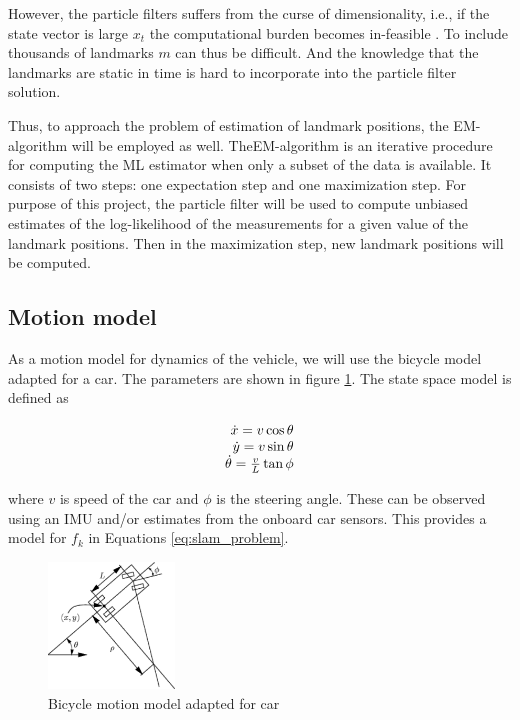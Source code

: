 However, the particle filters suffers from the curse of
dimensionality, i.e., if the state vector is large $x_t$ the
computational burden becomes in-feasible \cite{1453762}. To include
thousands of landmarks $m$ can thus be difficult. And the knowledge
that the landmarks are static in time is hard to incorporate into the
particle filter solution.

Thus, to approach the problem of estimation of landmark positions, the
\gls{EM}-algorithm \cite{Dempster77maximumlikelihood} will be employed
as well. The\gls{EM}-algorithm is an iterative procedure for computing
the \gls{ML} estimator when only a subset of the data is available. It
consists of two steps: one expectation step and one maximization
step. For purpose of this project, the particle filter will be used to compute
unbiased estimates of the log-likelihood of the measurements for a
given value of the landmark positions. Then in the maximization step,
new landmark positions will be computed.



\subsection{Motion model}

As a motion model for dynamics of the vehicle, we will use the bicycle model
adapted for a
car.
The parameters are shown in figure \ref{fig:motion_model}. The state space
model is defined as

\begin{equation}
 \begin{array}[b]{r}
  \dot{x}  = v \cos \theta \\
  \dot{y}  = v \sin \theta \\
  \dot{\theta}  = \frac{v}{L} \tan{\phi}
 \end{array}
\end{equation}

where $v$ is speed of the car and $\phi$ is the steering angle.
These can be observed using an \gls{IMU} and/or estimates from the onboard car
sensors. This provides a model for $f_k$ in Equations \eqref{eq:slam_problem}.

\begin{figure}
\centering
\label{fig:motion_model}
\includegraphics[width=0.3\textwidth]{figures/bicycle_model.pdf}
\caption{Bicycle motion model adapted for car}
\end{figure}


